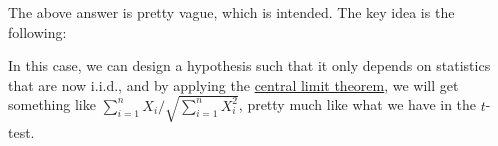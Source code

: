 The above answer is pretty vague, which is intended. The key idea is the following:

\begin{intuition}
	In this case, we can design a hypothesis such that it only depends on statistics that are now i.i.d., and by applying the \hyperref[thm:CLT]{central limit theorem}, we will get something like \(\sum_{i=1}^{n} X_i / \sqrt{\sum_{i=1}^{n} X_i^2} \), pretty much like what we have in the \(t\)-test.
\end{intuition}